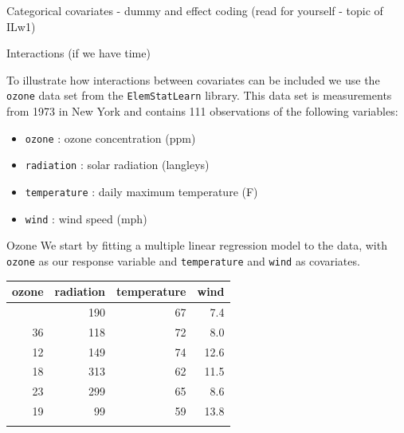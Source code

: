 \documentclass[
  ignorenonframetext,
]{beamer}
\providecommand{\tightlist}{%
  \setlength{\itemsep}{0pt}\setlength{\parskip}{0pt}}
\begin{document}
\begin{frame}{Categorical covariates - dummy and effect coding}
\label{categorical-covariates---dummy-and-effect-coding}
(read for yourself - topic of ILw1)
\end{frame}

\begin{frame}[fragile]{Interactions}
\label{interactions}
(if we have time)

To illustrate how interactions between covariates can be included we use
the \texttt{ozone} data set from the \texttt{ElemStatLearn} library.
This data set is measurements from 1973 in New York and contains 111
observations of the following variables:

\begin{itemize}
\tightlist
\item
  \texttt{ozone} : ozone concentration (ppm)
\item
  \texttt{radiation} : solar radiation (langleys)
\item
  \texttt{temperature} : daily maximum temperature (F)
\item
  \texttt{wind} : wind speed (mph)
\end{itemize}
\end{frame}

\begin{frame}[fragile]{Ozone}
\label{ozone}
We start by fitting a multiple linear regression model to the data, with
\texttt{ozone} as our response variable and \texttt{temperature} and
\texttt{wind} as covariates.

\begin{longtable}[]{@{}rrrr@{}}
\toprule\noalign{}
ozone & radiation & temperature & wind \\
\midrule\noalign{}
\endhead
41 & 190 & 67 & 7.4 \\
36 & 118 & 72 & 8.0 \\
12 & 149 & 74 & 12.6 \\
18 & 313 & 62 & 11.5 \\
23 & 299 & 65 & 8.6 \\
19 & 99 & 59 & 13.8 \\
\bottomrule\noalign{}
\end{longtable}
\end{frame}
\end{document}
